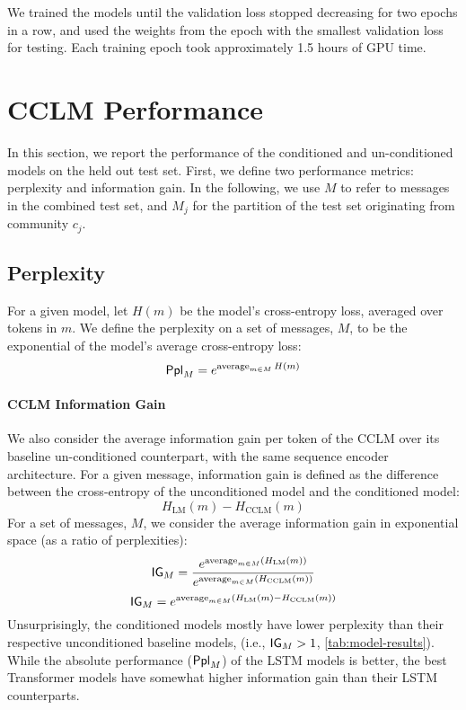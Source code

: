 \documentclass[11pt]{article}
\begin{document}
We trained the models until the validation loss stopped decreasing for
two epochs in a row, and used the weights from the epoch with the
smallest validation loss for testing. 
Each training epoch took approximately 1.5 hours of GPU time.


\section{CCLM Performance}\label{sec:performance}

In this section, we report the performance of the conditioned and un-conditioned
models on the held out test set.
First, we define two performance metrics: perplexity and information gain.
In the following, we use $M$ to refer to messages in the
combined test set, and $M_j$ for the partition of the test set originating from 
community $c_j$.

\subsection{Perplexity}\label{sec:ppl}

For a given model, let $H(m)$ be the model's cross-entropy loss,
averaged over tokens in $m$.
We define the perplexity on a set of messages, $M$,
to be the exponential of the model's average cross-entropy loss:
\[\mathsf{Ppl}_M = e^{\operatorname*{average}_{m\in M} H(m)}\]

\paragraph{CCLM Information Gain}\label{sec:ig}

We also consider the average information gain per token of the CCLM over its baseline
un-conditioned counterpart, with the same sequence encoder architecture.
For a given message, information gain is defined as the difference
between the cross-entropy of the unconditioned model and the conditioned model:
\[H_{\mathrm{LM}}(m) - H_{\mathrm{CCLM}}(m)\]
For a set of messages, $M$, we consider the average information gain
in exponential space (as a ratio of perplexities):
\[\mathsf{IG}_M = \frac{e^{\operatorname*{average}_{m \in M}(H_{\mathrm{LM}}(m))}}{e^{\operatorname*{average}_{m \in M}(H_{\mathrm{CCLM}}(m))}}\]
\[\mathsf{IG}_M = {e^{\operatorname*{average}_{m \in M}(H_{\mathrm{LM}}(m) - H_{\mathrm{CCLM}}(m))}}\]
%
Unsurprisingly, the conditioned models mostly have lower perplexity 
than their respective unconditioned baseline models, 
(i.e., $\mathsf{IG}_M > 1$, \cref{tab:model-results}).
While the absolute performance ($\mathsf{Ppl}_{M}$) of the LSTM models is better,
the best Transformer models have somewhat higher information gain
than their LSTM counterparts.
\end{document}
